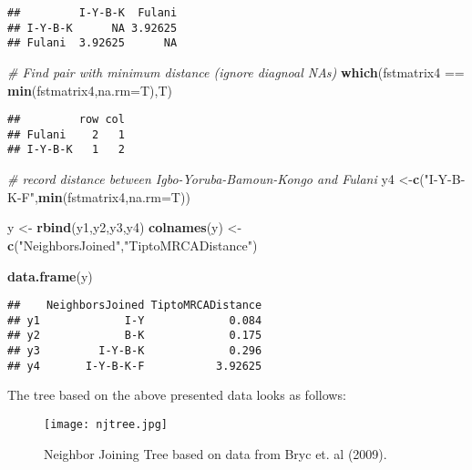 \documentclass[]{article}
\newenvironment{Shaded}{\begin{snugshade}}{\end{snugshade}}
\newcommand{\KeywordTok}[1]{\textcolor[rgb]{0.13,0.29,0.53}{\textbf{{#1}}}}
\newcommand{\DataTypeTok}[1]{\textcolor[rgb]{0.13,0.29,0.53}{{#1}}}
\newcommand{\StringTok}[1]{\textcolor[rgb]{0.31,0.60,0.02}{{#1}}}
\newcommand{\CommentTok}[1]{\textcolor[rgb]{0.56,0.35,0.01}{\textit{{#1}}}}
\newcommand{\NormalTok}[1]{{#1}}
\begin{document}
\begin{verbatim}
##         I-Y-B-K  Fulani
## I-Y-B-K      NA 3.92625
## Fulani  3.92625      NA
\end{verbatim}

\begin{Shaded}
\begin{Highlighting}[]
\CommentTok{# Find pair with minimum distance (ignore diagnoal NAs)}
\KeywordTok{which}\NormalTok{(fstmatrix4 ==}\StringTok{ }\KeywordTok{min}\NormalTok{(fstmatrix4,}\DataTypeTok{na.rm=}\NormalTok{T),T)}
\end{Highlighting}
\end{Shaded}

\begin{verbatim}
##         row col
## Fulani    2   1
## I-Y-B-K   1   2
\end{verbatim}

\begin{Shaded}
\begin{Highlighting}[]
\CommentTok{# record distance between Igbo-Yoruba-Bamoun-Kongo and Fulani}
\NormalTok{y4 <-}\KeywordTok{c}\NormalTok{(}\StringTok{"I-Y-B-K-F"}\NormalTok{,}\KeywordTok{min}\NormalTok{(fstmatrix4,}\DataTypeTok{na.rm=}\NormalTok{T))}

\NormalTok{y <-}\StringTok{ }\KeywordTok{rbind}\NormalTok{(y1,y2,y3,y4)}
\KeywordTok{colnames}\NormalTok{(y) <-}\StringTok{ }\KeywordTok{c}\NormalTok{(}\StringTok{"NeighborsJoined"}\NormalTok{,}\StringTok{"TiptoMRCADistance"}\NormalTok{)}
\end{Highlighting}
\end{Shaded}

\pagebreak

\begin{Shaded}
\begin{Highlighting}[]
\KeywordTok{data.frame}\NormalTok{(y)}
\end{Highlighting}
\end{Shaded}

\begin{verbatim}
##    NeighborsJoined TiptoMRCADistance
## y1             I-Y             0.084
## y2             B-K             0.175
## y3         I-Y-B-K             0.296
## y4       I-Y-B-K-F           3.92625
\end{verbatim}

The tree based on the above presented data looks as follows:

\begin{figure}[H]
\centering
\texttt{[image: njtree.jpg]}
\caption{\label{fig:njtree}Neighbor Joining Tree based on data from Bryc et. al (2009).}
\end{figure}
\end{document}
